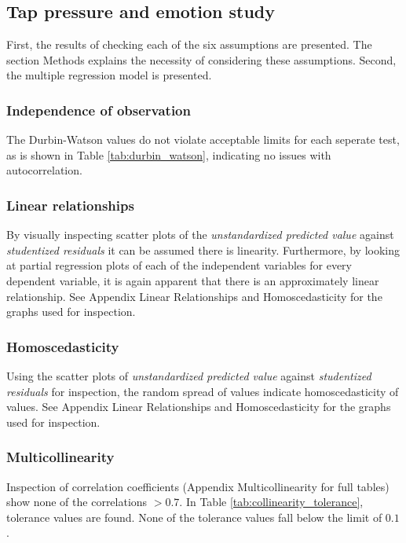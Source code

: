 \documentclass{sigchi}
\begin{document}
\subsection{Tap pressure and emotion study}
First, the results of checking each of the six assumptions are presented. The section Methods explains the necessity of considering these assumptions. Second, the multiple regression model is presented.
\label{sub:assumptions}

\subsubsection{Independence of observation}

The Durbin-Watson values do not violate acceptable limits for each seperate test, as is shown in Table \ref{tab:durbin_watson}, indicating no issues with autocorrelation.

\subsubsection{Linear relationships}
By visually inspecting scatter plots of the \textit{unstandardized predicted value} against \textit{studentized residuals} it can be assumed there is linearity. Furthermore, by looking at partial regression plots of each of the independent variables for every dependent variable, it is again apparent that there is an approximately linear relationship. See Appendix Linear Relationships and Homoscedasticity for the graphs used for inspection.

\subsubsection{Homoscedasticity}
Using the scatter plots of \textit{unstandardized predicted value} against \textit{studentized residuals} for inspection, the random spread of values indicate homoscedasticity of values. See Appendix Linear Relationships and Homoscedasticity for the graphs used for inspection.

\subsubsection{Multicollinearity}
Inspection of correlation coefficients (Appendix Multicollinearity for full tables) show none of the correlations $> 0.7$. In Table \ref{tab:collinearity_tolerance}, tolerance values are found. None of the tolerance values fall below the limit of $0.1$.

\end{document}
